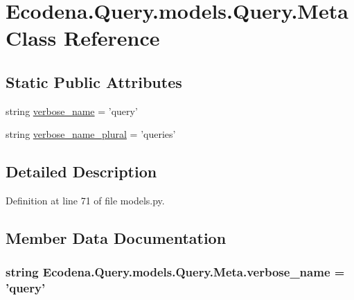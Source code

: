 \hypertarget{class_ecodena_1_1_query_1_1models_1_1_query_1_1_meta}{
\section{Ecodena.Query.models.Query.Meta Class Reference}
\label{d2/d09/class_ecodena_1_1_query_1_1models_1_1_query_1_1_meta}
}
\subsection*{Static Public Attributes}
\begin{DoxyCompactItemize}
\item 
string \hyperlink{class_ecodena_1_1_query_1_1models_1_1_query_1_1_meta_aa23af14d7fe26b0599114e73201de85c}{verbose\_\-name} = 'query'
\item 
string \hyperlink{class_ecodena_1_1_query_1_1models_1_1_query_1_1_meta_ac57db1e879cded42a3f4d35c04c56be8}{verbose\_\-name\_\-plural} = 'queries'
\end{DoxyCompactItemize}


\subsection{Detailed Description}


Definition at line 71 of file models.py.



\subsection{Member Data Documentation}
\hypertarget{class_ecodena_1_1_query_1_1models_1_1_query_1_1_meta_aa23af14d7fe26b0599114e73201de85c}{
\subsubsection[{verbose\_\-name}]{\setlength{\rightskip}{0pt plus 5cm}string {\bf Ecodena.Query.models.Query.Meta.verbose\_\-name} = 'query'}}
\label{d2/d09/class_ecodena_1_1_query_1_1models_1_1_query_1_1_meta_aa23af14d7fe26b0599114e73201de85c}


